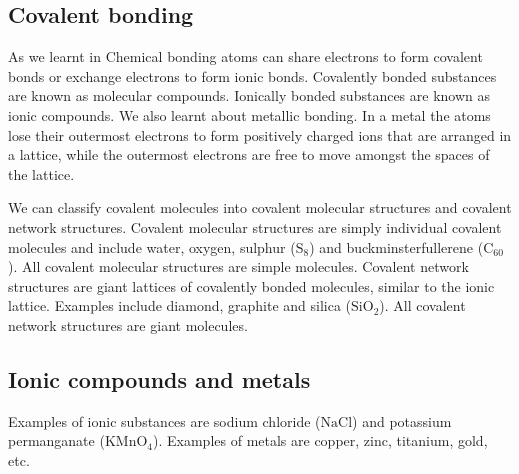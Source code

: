 \subsection*{Covalent bonding}
      \label{m38120*eip-819}As we learnt in Chemical bonding atoms can share electrons to form covalent bonds or exchange electrons to form ionic bonds. Covalently bonded substances are known as molecular compounds. Ionically bonded substances are known as ionic compounds. We also learnt about metallic bonding. In a metal the atoms lose their outermost electrons to form positively charged ions that are arranged in a lattice, while the outermost electrons are free to move amongst the spaces of the lattice. \par \label{m38120*eip-394}We can classify covalent molecules into covalent molecular structures and covalent network structures. Covalent molecular structures are simply individual covalent molecules and include water, oxygen, sulphur (${\mathrm{S}}_{8}$) and buckminsterfullerene (${\mathrm{C}}_{60}$). All covalent molecular structures are simple molecules. Covalent network structures are giant lattices of covalently bonded molecules, similar to the ionic lattice. Examples include diamond, graphite and silica (${\mathrm{SiO}}_{2}$). All covalent network structures are giant molecules.\par 
\subsection*{Ionic compounds and metals}
\label{m38120*eip-860}Examples of ionic substances are sodium chloride ($\mathrm{NaCl}$) and potassium permanganate (${\mathrm{KMnO}}_{4}$). Examples of metals are copper, zinc, titanium, gold, etc.\par \label{m38120*uid1}
